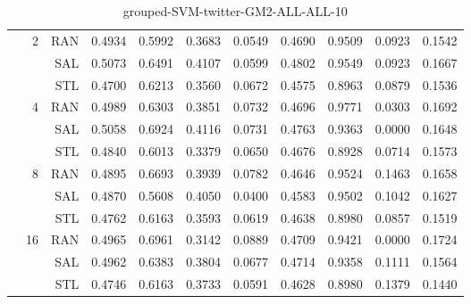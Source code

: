 \begin{center}
\begin{table}[htbp]
\begin{center}
\begin{tabular}{ | r | r | r | r | r | r | r | r | r | r | r |}
 & \multirow{3}{*}{2} & RAN & 0.4934 & 0.5992 & 0.3683 & 0.0549 & 0.4690 & 0.9509 & 0.0923 & 0.1542\\ \cline{3-11}
 &   & SAL & 0.5073 & 0.6491 & 0.4107 & 0.0599 & 0.4802 & 0.9549 & 0.0923 & 0.1667\\ \cline{3-11}
 &   & STL & 0.4700 & 0.6213 & 0.3560 & 0.0672 & 0.4575 & 0.8963 & 0.0879 & 0.1536\\ \cline{2-11}
 & \multirow{3}{*}{4} & RAN & 0.4989 & 0.6303 & 0.3851 & 0.0732 & 0.4696 & 0.9771 & 0.0303 & 0.1692\\ \cline{3-11}
 &   & SAL & 0.5058 & 0.6924 & 0.4116 & 0.0731 & 0.4763 & 0.9363 & 0.0000 & 0.1648\\ \cline{3-11}
 &   & STL & 0.4840 & 0.6013 & 0.3379 & 0.0650 & 0.4676 & 0.8928 & 0.0714 & 0.1573\\ \cline{2-11}
 & \multirow{3}{*}{8} & RAN & 0.4895 & 0.6693 & 0.3939 & 0.0782 & 0.4646 & 0.9524 & 0.1463 & 0.1658\\ \cline{3-11}
 &   & SAL & 0.4870 & 0.5608 & 0.4050 & 0.0400 & 0.4583 & 0.9502 & 0.1042 & 0.1627\\ \cline{3-11}
 &   & STL & 0.4762 & 0.6163 & 0.3593 & 0.0619 & 0.4638 & 0.8980 & 0.0857 & 0.1519\\ \cline{2-11}
 & \multirow{3}{*}{16} & RAN & 0.4965 & 0.6961 & 0.3142 & 0.0889 & 0.4709 & 0.9421 & 0.0000 & 0.1724\\ \cline{3-11}
 &   & SAL & 0.4962 & 0.6383 & 0.3804 & 0.0677 & 0.4714 & 0.9358 & 0.1111 & 0.1564\\ \cline{3-11}
 &   & STL & 0.4746 & 0.6163 & 0.3733 & 0.0591 & 0.4628 & 0.8980 & 0.1379 & 0.1440\\ \cline{2-11}
\hline
\end{tabular}
\caption{grouped-SVM-twitter-GM2-ALL-ALL-10}
\end{center}
 \end{table}
\end{center}

